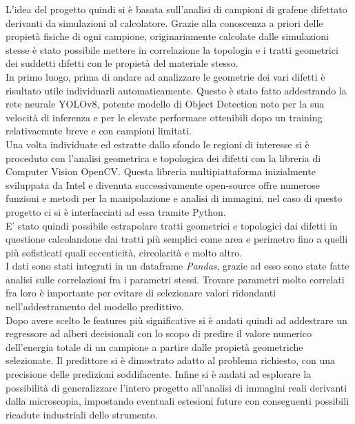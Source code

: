 \documentclass[12pt,a4paper,openright,twoside]{report}
\begin{document}
L'idea del progetto quindi si è basata sull'analisi di campioni di grafene difettato derivanti da simulazioni al calcolatore. Grazie alla conoscenza a priori delle propietà fisiche di ogni campione, originariamente calcolate dalle simulazioni stesse è stato possibile mettere in correlazione la topologia e i tratti geometrici dei suddetti difetti con le propietà del materiale stesso.\\
In primo luogo, prima di andare ad analizzare le geometrie dei vari difetti è risultato utile individuarli automaticamente. 
Questo è stato fatto addestrando la rete neurale YOLOv8, potente modello di Object Detection noto per la sua velocità di inferenza e per le elevate performace ottenibili dopo un training relativaemnte breve e con campioni limitati.\\
Una volta individuate ed estratte dallo sfondo le regioni di interesse si è proceduto con l'analisi geometrica e topologica dei difetti con la libreria di Computer Vision OpenCV.
Questa libreria multipiattaforma inizialmente sviluppata da Intel e divenuta successivamente open-source offre numerose funzioni e metodi per la manipolazione e analisi di immagini, nel caso di questo progetto ci si è interfacciati ad essa tramite Python. \\
E' stato quindi possibile estrapolare tratti geometrici e topologici dai difetti in questione calcolandone dai tratti più semplici come area e perimetro fino a quelli più sofisticati quali eccenticità, circolarità e molto altro.\\
I dati sono stati integrati in un dataframe \emph{Pandas}, grazie ad esso sono state fatte analisi sulle correlazioni fra i parametri stessi. Trovare parametri molto correlati fra loro è importante per evitare di selezionare valori ridondanti nell'addestramento del modello predittivo.\\
Dopo avere scelto le features più significative si è andati quindi ad addestrare un regressore ad alberi decisionali con lo scopo di predire il valore numerico dell'energia totale di un campione a partire dalle propietà geometriche selezionate. Il predittore si è dimostrato adatto al problema richiesto, con una precisione delle predizioni soddifacente.
Infine si è andati ad esplorare la possibilità di generalizzare l'intero progetto all'analisi di immagini reali derivanti dalla microscopia, impostando eventuali estesioni future con conseguenti possibili ricadute industriali dello strumento. 
\clearpage{\pagestyle{empty}\cleardoublepage}
\rhead[\fancyplain{}{\bfseries\leftmark}]{\fancyplain{}{\bfseries\thepage}}
\end{document}
